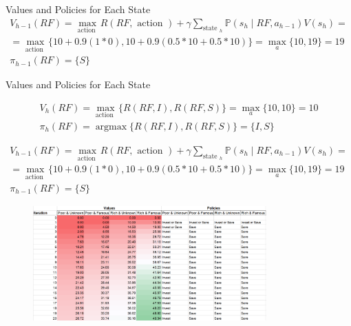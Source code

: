 \documentclass[11pt,table]{beamer}
\begin{document}
\begin{frame}{Values and Policies for Each State}
$$
\begin{gathered}
V_{h-1}(R F)=\max _{\text {action }} R(R F, \text { action })+\gamma \sum_{\text {state }_{h}} \mathbb{P}\left(s_{h} \mid R F, a_{h-1}\right) V\left(s_{h}\right)= \\
=\max _{\text {action }}\{10+0.9(1 * 0), 10+0.9(0.5 * 10+0.5 * 10)\}=\max _{a}\{10,19\}=19 \\
\pi_{h-1}(R F)=\{S\}
\end{gathered}
$$
    
\end{frame}



\begin{frame}{Values and Policies for Each State}

\footnotesize
$$
\begin{gathered}
V_{h}(R F)=\max _{\text {action }}\{R(R F, I), R(R F, S)\}=\max _{a}\{10,10\}=10 \\
\pi_{h}(R F)=\operatorname{argmax}\{R(R F, I), R(R F, S)\}=\{I, S\}
\end{gathered}
$$

$$
\begin{gathered}
V_{h-1}(R F)=\max _{\text {action }} R(R F, \text { action })+\gamma \sum_{\text {state }_{h}} \mathbb{P}\left(s_{h} \mid R F, a_{h-1}\right) V\left(s_{h}\right)= \\
=\max _{\text {action }}\{10+0.9(1 * 0), 10+0.9(0.5 * 10+0.5 * 10)\}=\max _{a}\{10,19\}=19 \\
\pi_{h-1}(R F)=\{S\}
\end{gathered}
$$

\begin{figure}
	\centering
		\includegraphics[width=0.80\textwidth]{figures/values_policies_convergence.png}
	\label{fig:values_policies_convergence}
\end{figure}

    
\end{frame}
\end{document}
